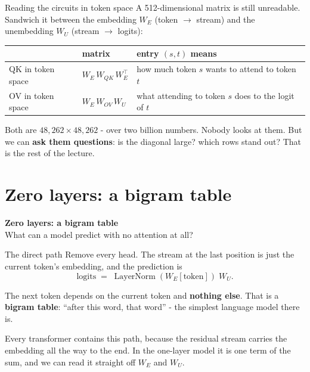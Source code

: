 \documentclass[aspectratio=169]{beamer}
\newcommand{\keybox}[1]{%
  \begin{tcolorbox}[colback=armblue!8, colframe=armblue, boxrule=0.6pt, arc=2pt]
  #1
  \end{tcolorbox}}
\newcommand{\sectiontransition}[2]{%
  \begin{frame}[plain]
    \vfill
    \begin{center}
      {\Huge\bfseries\color{popblue} #1}\\[1.1em]
      {\large #2}
    \end{center}
    \vfill
  \end{frame}}
\begin{document}
\begin{frame}{Reading the circuits in token space}
  \vspace{0.4em}
  A 512-dimensional matrix is still unreadable. Sandwich it between the embedding $W_E$ (token
  $\rightarrow$ stream) and the unembedding $W_U$ (stream $\rightarrow$ logits):

  \vspace{0.5em}
  \begin{center}
  \small
  \begin{tabular}{@{}lll@{}}
    \toprule
    & \textbf{matrix} & \textbf{entry $(s, t)$ means}\\
    \midrule
    QK in token space & $W_E\, W_{QK}\, W_E^{\top}$ & how much token $s$ wants to attend to token $t$\\[0.3em]
    OV in token space & $W_E\, W_{OV}\, W_U$ & what attending to token $s$ does to the logit of $t$\\
    \bottomrule
  \end{tabular}
  \end{center}

  \vspace{0.6em}
  Both are $48{,}262 \times 48{,}262$ - over two billion numbers. Nobody looks at them. But we can
  \textbf{ask them questions}: is the diagonal large? which rows stand out? That is the rest of the
  lecture.
\end{frame}

\section{Zero layers: a bigram table}
\sectiontransition{Zero layers: a bigram table}{What can a model predict with no attention at all?}

\begin{frame}{The direct path}
  \vspace{0.6em}
  Remove every head. The stream at the last position is just the current token's embedding, and
  the prediction is
  \[
    \text{logits} \;=\; \operatorname{LayerNorm}(W_E[\text{token}])\; W_U .
  \]

  \vspace{0.3em}
  The next token depends on the current token and \textbf{nothing else}. That is a
  \textbf{bigram table}: ``after this word, that word'' - the simplest language model there is.

  \vspace{0.6em}
  \keybox{\small Every transformer contains this path, because the residual stream carries the
  embedding all the way to the end. In the one-layer model it is one term of the sum, and we can
  read it straight off $W_E$ and $W_U$.}
\end{frame}
\end{document}
